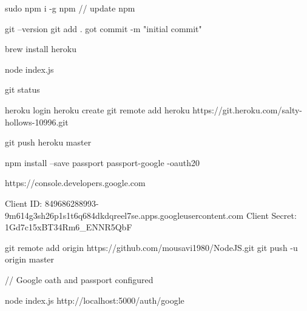 sudo npm i -g npm  // update npm


git --version
git add .
got commit -m "initial commit"

brew install heroku

node index.js

git status

heroku login
heroku create
git remote add heroku https://git.heroku.com/salty-hollows-10996.git


git push heroku master

npm install --save passport passport-google -oauth20

https://console.developers.google.com

Client ID: 849686288993-9m614g3sh26p1s1t6q684dkdqreel7se.apps.googleusercontent.com
Client Secret: 1Gd7c15xBT34Rm6_ENNR5QbF

git remote add origin https://github.com/mousavi1980/NodeJS.git
git push -u origin master

// Google oath and passport configured

node index.js
http://localhost:5000/auth/google